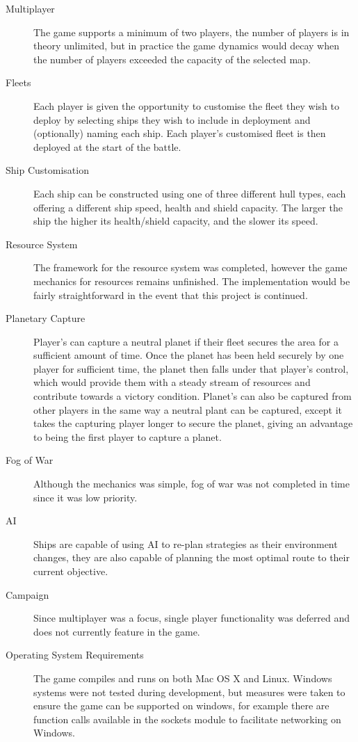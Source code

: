 \begin{description}

  \item[Multiplayer] The game supports a minimum of two players, the number of players is in theory unlimited, but in practice the game dynamics would decay when the number of players exceeded the capacity of the selected map.

  \item[Fleets] Each player is given the opportunity to customise the fleet they wish to deploy by selecting ships they wish to include in deployment and (optionally) naming each ship. Each player's customised fleet is then deployed at the start of the battle.

  \item[Ship Customisation] Each ship can be constructed using one of three different hull types, each offering a different ship speed, health and shield capacity. The larger the ship the higher its health/shield capacity, and the slower its speed.

  \item[Resource System] The framework for the resource system was completed, however the game mechanics for resources remains unfinished. The implementation 
would be fairly straightforward in the event that this project is continued.

  \item[Planetary Capture] Player's can capture a neutral planet if their fleet secures the area for a sufficient amount of time. Once the planet has been held securely by one player for sufficient time, the planet then falls under that player's control, which would provide them with a steady stream of resources and contribute towards a victory condition. Planet's can also be captured from other players in the same way a neutral plant can be captured, except it takes the capturing player longer to secure the planet, giving an advantage to being the first player to capture a planet.

  \item[Fog of War] Although the mechanics was simple, fog of war was not completed in time since it was low priority. 

  \item[AI] Ships are capable of using AI to re-plan strategies as their environment changes, they are also capable of planning the most optimal route to their current objective.

  \item[Campaign] Since multiplayer was a focus, single player functionality was deferred and does not currently feature in the game.

  \item[Operating System Requirements] The game compiles and runs on both Mac OS X and Linux. Windows systems were not tested during development, but measures were taken to ensure the game can be supported on windows, for example there are function calls available in the sockets module to facilitate networking on Windows.

\end{description}

